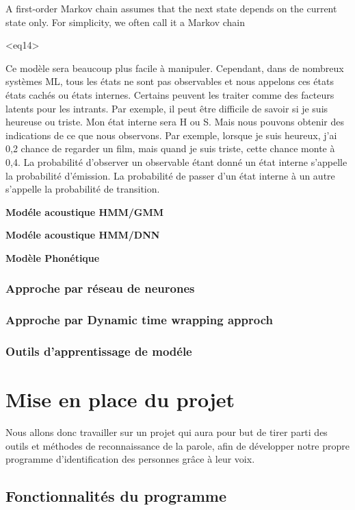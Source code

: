 \documentclass[a4paper, 12pt]{book}
\newcounter{program}[subsection]
\begin{document}
A first-order Markov chain assumes that the next state depends on the current state only. For simplicity, we often call it a Markov chain

<eq14>

Ce modèle sera beaucoup plus facile à manipuler. Cependant, dans de nombreux systèmes ML, tous les états ne sont pas observables et nous appelons ces états états cachés ou états internes. Certains peuvent les traiter comme des facteurs latents pour les intrants. Par exemple, il peut être difficile de savoir si je suis heureuse ou triste. Mon état interne sera {H ou S}. Mais nous pouvons obtenir des indications de ce que nous observons. Par exemple, lorsque je suis heureux, j'ai 0,2 chance de regarder un film, mais quand je suis triste, cette chance monte à 0,4. La probabilité d'observer un observable étant donné un état interne s'appelle la probabilité d'émission. La probabilité de passer d'un état interne à un autre s'appelle la probabilité de transition.

\textbf{Modéle acoustique HMM/GMM}

\textbf{Modéle acoustique HMM/DNN}

\textbf{Modèle Phonétique}

\subsection{Approche par réseau de neurones}

\subsection{Approche par Dynamic time wrapping approch}

\subsection{Outils d'apprentissage de modéle}


\chapter{Mise en place du projet}

Nous allons donc travailler sur un projet qui aura pour but de tirer parti des outils et méthodes de reconnaissance de la parole, afin de développer notre propre programme d'identification des personnes grâce à leur voix.

\section{Fonctionnalités du programme}
\end{document}
